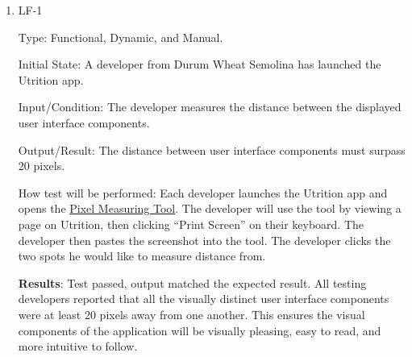 \documentclass[12pt, titlepage]{article}
\begin{document}
	\begin{enumerate}
		\item{LF-1} 
		
		Type: Functional, Dynamic, and Manual.
		
		Initial State: A developer from Durum Wheat Semolina has launched the Utrition app.
		
		Input/Condition: The developer measures the distance between the displayed user interface components.
		
		Output/Result: The distance between user interface components must surpass 20 pixels.
		
		How test will be performed: Each developer launches the Utrition app and opens the \href{https://www.rapidtables.com/web/tools/pixel-ruler.html}{Pixel Measuring Tool}. The developer will use the tool by viewing a page on Utrition, then clicking “Print Screen'' on their keyboard. The developer then pastes the screenshot into the tool. The developer clicks the two spots he would like to measure distance from.
		
		\textbf{Results}: Test passed, output matched the expected result. All testing developers reported that all the visually distinct user interface components were at least 20 pixels away from one another. This ensures the visual components of the application will be visually pleasing, easy to read, and more intuitive to follow.
		
	\end{enumerate}
	
\end{document}
